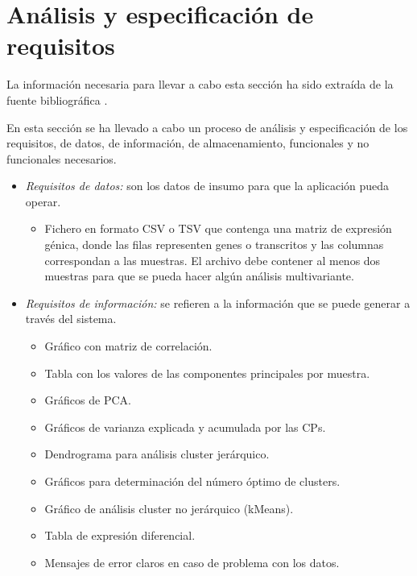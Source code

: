 \section{Análisis y especificación de requisitos}

La información necesaria para llevar a cabo esta sección ha sido extraída de la fuente bibliográfica \cite{requisitos}. \newline

En esta sección se ha llevado a cabo un proceso de análisis y especificación de los requisitos, de datos, de información, de almacenamiento,
funcionales y no funcionales necesarios. \newline

\begin{itemize}
    \item \textit{Requisitos de datos:} son los datos de insumo para que la aplicación pueda operar.
    \begin{itemize}
        \item Fichero en formato CSV o TSV que contenga una matriz de expresión génica, donde las filas representen genes o transcritos y 
        las columnas correspondan a las muestras. El archivo debe contener al menos dos muestras para que se pueda hacer algún análisis multivariante.
    \end{itemize}

    \item \textit{Requisitos de información:} se refieren a la información que se puede generar a través del sistema.
    \begin{itemize}
        \item Gráfico con matriz de correlación.
        \item Tabla con los valores de las componentes principales por muestra.
        \item Gráficos de PCA.
        \item Gráficos de varianza explicada y acumulada por las CPs.
        \item Dendrograma para análisis cluster jerárquico.
        \item Gráficos para determinación del número óptimo de clusters.
        \item Gráfico de análisis cluster no jerárquico (kMeans).
        \item Tabla de expresión diferencial.
        \item Mensajes de error claros en caso de problema con los datos.
    \end{itemize}


\end{itemize}
